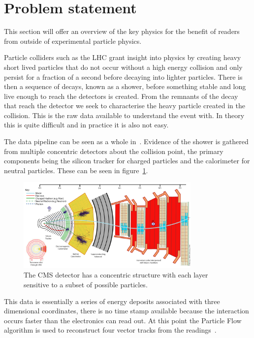 \section{Problem statement}
This section will offer an overview of the key physics for the benefit
of readers from outside of experimental particle physics.

Particle colliders such as the LHC grant insight into physics by
creating heavy short lived particles that do not occur without a high energy collision
and only persist for a fraction of a second before decaying into lighter particles.
There is then a sequence of decays, known as a shower, before something
stable and long live enough to reach the detectors is created.
From the remnants of the decay that reach the detector we seek
to characterise the heavy particle created in the collision.
This is the raw data available to understand the event with.
In theory this is quite difficult and in practice it is also not easy.

The data pipeline can be seen as a whole in~\cite{Stoye_DeepCMS2018, Schramm:2291608}.
Evidence of the shower is gathered from multiple concentric detectors about the collision point, the primary components being the 
silicon tracker for charged particles and the calorimeter for neutral particles. 
These can be seen in figure~\ref{fig:lit_CMSdetector}.
\begin{figure}
    \centering
    \includegraphics[width=0.8\textwidth]{images/lit_CMSdetector.png}
    \caption{The CMS detector has a concentric structure with each layer sensitive to a subset of possible particles.
             \cite{Stoye_DeepCMS2018}}
    \label{fig:lit_CMSdetector}
\end{figure}
This data is essentially a series of energy deposits associated with three dimensional coordinates,
there is no time stamp available because the interaction occurs faster than the electronics can read out.
At this point the Particle Flow algorithm is used to reconstruct four vector tracks from the readings~\cite{Beaudette_particleFlow2013}.

